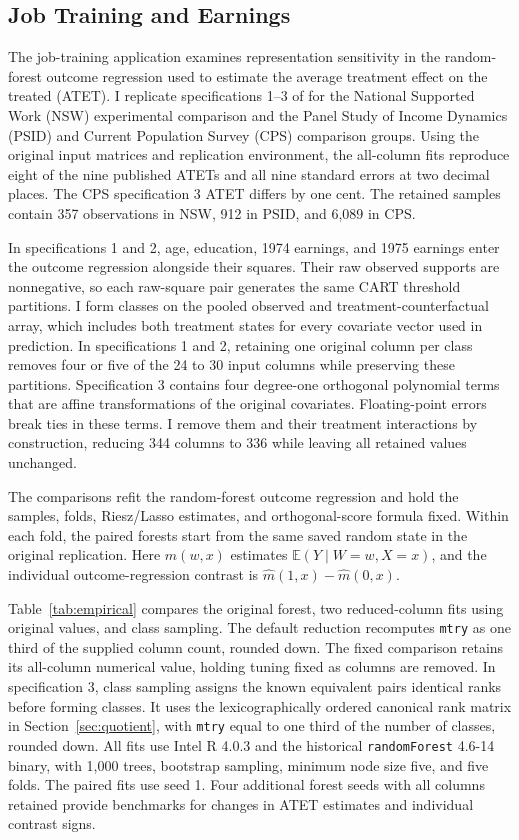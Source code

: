 \documentclass[12pt]{article}
\newcommand{\E}{\mathbb E}
\begin{document}
\FloatBarrier

\subsection{Job Training and Earnings}

The job-training application examines representation sensitivity in the random-forest outcome regression used to estimate the average treatment effect on the treated (ATET). I replicate specifications 1--3 of \citet{chernozhukov2022automatic} for the National Supported Work (NSW) experimental comparison and the Panel Study of Income Dynamics (PSID) and Current Population Survey (CPS) comparison groups. Using the original input matrices and replication environment, the all-column fits reproduce eight of the nine published ATETs and all nine standard errors at two decimal places. The CPS specification 3 ATET differs by one cent. The retained samples contain 357 observations in NSW, 912 in PSID, and 6,089 in CPS.

In specifications 1 and 2, age, education, 1974 earnings, and 1975 earnings enter the outcome regression alongside their squares. Their raw observed supports are nonnegative, so each raw-square pair generates the same CART threshold partitions. I form classes on the pooled observed and treatment-counterfactual array, which includes both treatment states for every covariate vector used in prediction. In specifications 1 and 2, retaining one original column per class removes four or five of the 24 to 30 input columns while preserving these partitions. Specification 3 contains four degree-one orthogonal polynomial terms that are affine transformations of the original covariates. Floating-point errors break ties in these terms. I remove them and their treatment interactions by construction, reducing 344 columns to 336 while leaving all retained values unchanged.

The comparisons refit the random-forest outcome regression and hold the samples, folds, Riesz/Lasso estimates, and orthogonal-score formula fixed. Within each fold, the paired forests start from the same saved random state in the original replication. Here \(\widehat m(w,x)\) estimates \(\E(Y\mid W=w,X=x)\), and the individual outcome-regression contrast is \(\widehat m(1,x)-\widehat m(0,x)\).

Table~\ref{tab:empirical} compares the original forest, two reduced-column fits using original values, and class sampling. The default reduction recomputes \texttt{mtry} as one third of the supplied column count, rounded down. The fixed comparison retains its all-column numerical value, holding tuning fixed as columns are removed. In specification 3, class sampling assigns the known equivalent pairs identical ranks before forming classes. It uses the lexicographically ordered canonical rank matrix in Section~\ref{sec:quotient}, with \texttt{mtry} equal to one third of the number of classes, rounded down. All fits use Intel R 4.0.3 and the historical \texttt{randomForest} 4.6-14 binary, with 1,000 trees, bootstrap sampling, minimum node size five, and five folds. The paired fits use seed 1. Four additional forest seeds with all columns retained provide benchmarks for changes in ATET estimates and individual contrast signs.
\end{document}
